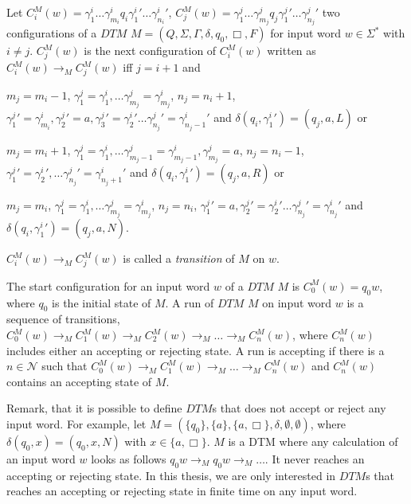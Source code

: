 \begin{definition}
    Let $C_i^M(w) = \gamma_1^i\dots\gamma_{m_i}^i{q_i}{\gamma_1^i}'\dots{\gamma_{n_i}^i}'$, $C_j^M(w) =
    \gamma_1^j\dots\gamma_{m_j}^j{q_j}{\gamma_1^j}'\dots{\gamma_{n_j}^j}'$ two configurations of a $\mathit{DTM}$ $M = (Q, \Sigma,
    \Gamma,
    \delta, q_0, \Box, F)$ for input word $w \in \Sigma^*$ with $i \neq j$. $C_j^M(w)$ is the next configuration
    of $C_i^M(w)$ written as $C_i^M(w) \rightarrow_M C_j^M(w)$ iff $j = i + 1$ and
    \begin{compactitem}
        \item $m_j = m_i - 1$, $\gamma_1^j = \gamma_1^i, \dots \gamma_{m_j}^j = \gamma_{m_j}^i$, $n_j = n_i + 1$,
        ${\gamma_1^j}' = \gamma_{m_i}^i, {\gamma_2^j}' = a, {\gamma_3^j}' = {\gamma_2^i}' \dots {\gamma_{n_j}^j}' =
        {\gamma_{{n_j}- 1}^i}'$ and $\delta(q_i, {\gamma_1^i}') = (q_j, a, L)$ or
        \item $m_j = m_i + 1$, $\gamma_1^j = \gamma_1^i, \dots \gamma_{m_j-1}^j = \gamma_{m_j-1}^i, \gamma_{m_j}^j
        = a$, $n_j = n_i - 1$, ${\gamma_1^j}' = {\gamma_2^i}', \dots {\gamma_{n_j}^j}' = {\gamma_{{n_j}+1}^i}'$ and
$\delta (q_i, {\gamma_1^i}') = (q_j, a, R)$ or
        \item $m_j = m_i$, $\gamma_1^j = \gamma_1^i, \dots \gamma_{m_j}^j = \gamma_{m_j}^i$, $n_j = n_i$, ${\gamma_1^j}'
= a, {\gamma_2^j}' = {\gamma_2^i}' \dots {\gamma_{n_j}^j}' = {\gamma_{n_j}^i}'$ and $\delta
        (q_i, {\gamma_1^i}') = (q_j, a, N)$.
    \end{compactitem}
    $C_i^M(w) \rightarrow_M C_j^M(w)$ is called a \emph{transition} of $M$ on $w$.
\end{definition}

The start configuration for an input word $w$ of a $\mathit{DTM}$ $M$ is $C_0^M(w) = q_0w$, where $q_0$ is the
initial state of $M$. A run of $\mathit{DTM}$ $M$ on input word $w$ is a sequence of transitions, $C_0^M(w)
\rightarrow_M C_1^M(w) \rightarrow_M C_2^M(w) \rightarrow_M \dots \rightarrow_M C_n^M(w)$, where $C_n^M(w)$ includes
either an accepting or rejecting state. A run is accepting if there is a $n \in \mathcal{N}$ such that $C_0^M(w)
\rightarrow_M C_1^M(w) \rightarrow_M \dots \rightarrow_M C_n^M(w)$ and $C_n^M(w)$ contains an accepting state of $M$.

Remark, that it is possible to define $\mathit{DTM}$s that does not accept or reject any input word. For example, let
$M = (\{q_0\}, \{a\}, \{a, \Box\}, \delta, \emptyset, \emptyset)$, where $\delta(q_0, x) = (q_0, x, N)$ with $x \in
\{a, \Box\}$. $M$ is a DTM where any calculation of an input word $w$ looks as follows $q_0w \rightarrow_M q_0w
\rightarrow_M \dots$. It never reaches an accepting or rejecting state. In this thesis, we are only interested in
$\mathit{DTM}$s that reaches an accepting or rejecting state in finite time on any input word.

